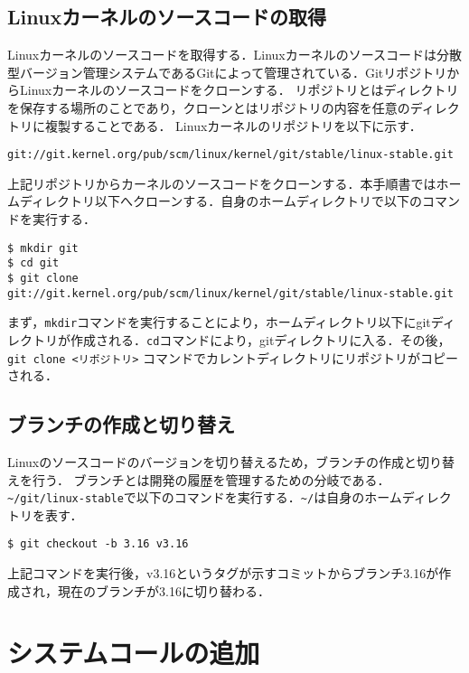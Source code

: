 \documentclass[12pt]{jsarticle}
\begin{document}
\subsection{Linuxカーネルのソースコードの取得}\label{subsec:get kernel code}
Linuxカーネルのソースコードを取得する．Linuxカーネルのソースコードは分散型バージョン管理システムであるGitによって管理されている．GitリポジトリからLinuxカーネルのソースコードをクローンする．
リポジトリとはディレクトリを保存する場所のことであり，クローンとはリポジトリの内容を任意のディレクトリに複製することである．
Linuxカーネルのリポジトリを以下に示す．

\begin{verbatim}
git://git.kernel.org/pub/scm/linux/kernel/git/stable/linux-stable.git
\end{verbatim}

\noindent
上記リポジトリからカーネルのソースコードをクローンする．本手順書ではホームディレクトリ以下へクローンする．自身のホームディレクトリで以下のコマンドを実行する．
\begin{verbatim}
$ mkdir git
$ cd git
$ git clone git://git.kernel.org/pub/scm/linux/kernel/git/stable/linux-stable.git
\end{verbatim}
まず，\verb|mkdir|コマンドを実行することにより，ホームディレクトリ以下にgitディレクトリが作成される．\verb|cd|コマンドにより，gitディレクトリに入る．その後，\verb|git clone <リポジトリ>| コマンドでカレントディレクトリにリポジトリがコピーされる．

\subsection{ブランチの作成と切り替え}\label{subsec:checkout branch}
Linuxのソースコードのバージョンを切り替えるため，ブランチの作成と切り替えを行う．
ブランチとは開発の履歴を管理するための分岐である．
\verb|~/git/linux-stable|で以下のコマンドを実行する．\verb|~/|は自身のホームディレクトリを表す．
\begin{verbatim}
$ git checkout -b 3.16 v3.16
\end{verbatim}
上記コマンドを実行後，v3.16というタグが示すコミットからブランチ3.16が作成され，現在のブランチが3.16に切り替わる．

\section{システムコールの追加}\label{sec:add systemcall}
\end{document}
